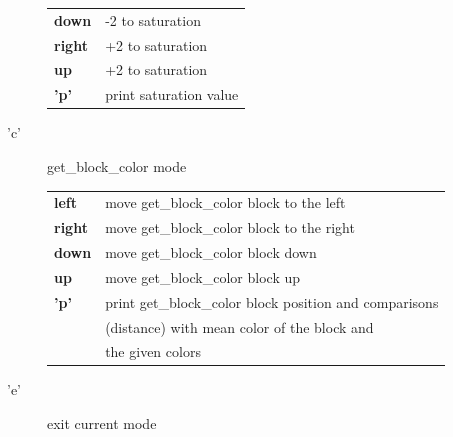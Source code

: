 \begin{description}
\begin{tabular}{ll}
                {\bf down } & -2 to saturation \\
                {\bf right} & +2 to saturation \\
                {\bf up   } & +2 to saturation \\
                {\bf 'p'  } & print saturation value \\
            \end{tabular}
        \item['c'] get\_block\_color mode \\
            \begin{tabular}{ll} 
                {\bf left } & move get\_block\_color block to the left  \\
                {\bf right} & move get\_block\_color block to the right \\
                {\bf down } & move get\_block\_color block down \\
                {\bf up   } & move get\_block\_color block up \\
                {\bf 'p'  } & print get\_block\_color block position and 
                              comparisons \\
                            & (distance) with mean color of 
                              the block and \\
                            & the given colors \\
            \end{tabular}
        \item['e'] exit current mode
    \end{description}
